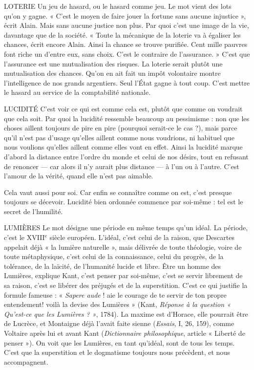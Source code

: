 {LOTERIE Un jeu de hasard, ou le hasard comme jeu. Le mot vient des lots
qu’on y gagne. « C’est le moyen de faire jouer la fortune sans
aucune injustice », écrit Alain. Mais sans aucune justice non plus. Par quoi c’est
une image de la vie, davantage que de la société. « Toute la mécanique de la
loterie va à égaliser les chances, écrit encore Alain. Ainsi la chance se trouve
purifiée. Cent mille pauvres font riche un d’entre eux, sans choix. C’est le
contraire de l'assurance. » C’est que l’assurance est une mutualisation des
risques. La loterie serait plutôt une mutualisation des chances. Qu’on en ait fait
un impôt volontaire montre l'intelligence de nos grands argentiers. Seul l’État
gagne à tout coup. C’est mettre le hasard au service de la comptabilité nationale.

LUCIDITÉ C'est voir ce qui est comme cela est, plutôt que comme on voudrait
que cela soit. Par quoi la lucidité ressemble beaucoup au
pessimisme : non que les choses aillent toujours de pire en pire (pourquoi
serait-ce le cas ?), mais parce qu’il n’est pas d’usage qu’elles aillent comme nous
voudrions, ni habituel que nous voulions qu’elles aillent comme elles vont en
effet. Ainsi la lucidité marque d’abord la distance entre l’ordre du monde et
celui de nos désirs, tout en refusant de renoncer — car alors il n’y aurait plus distance
— à l’un ou à l’autre. C’est l'amour de la vérité, quand elle n’est pas
aimable.

Cela vaut aussi pour soi. Car enfin se connaître comme on est, c’est presque
toujours se décevoir. Lucidité bien ordonnée commence par soi-même : tel est
le secret de l'humilité.

LUMIÈRES Le mot désigne une période en même temps qu’un idéal. La
période, c’est le {\footnotesize XVIII$^\text{e}$} siècle européen. L'idéal, c’est celui de la
raison, que Descartes appelait déjà « la lumière naturelle », mais délivrée de
toute théologie, voire de toute métaphysique, c’est celui de la connaissance,
celui du progrès, de la tolérance, de la laïcité, de l’humanité lucide et libre. Être
un homme des Lumières, explique Kant, c’est penser par soi-même, c’est se
servir librement de sa raison, c’est se libérer des préjugés et de la superstition.
C'est ce qui justifie la formule fameuse : « {\it Sapere aude} ! aie le courage de te
servir de ton propre entendement! voilà la devise des Lumières » (Kant,
{\it Réponse à la question « Qu'est-ce que les Lumières ? »}, 1784). La maxime est
d’Horace, elle pourrait être de Lucrèce, et Montaigne déjà l’avait faite sienne
({\it Essais}, I, 26, 159), comme Voltaire après lui et avant Kant ({\it Dictionnaire philosophique},
article « Liberté de penser »). On voit que les Lumières, en tant
qu’idéal, sont de tous les temps. C’est que la superstition et le dogmatisme toujours
nous précèdent, et nous accompagnent.

}
